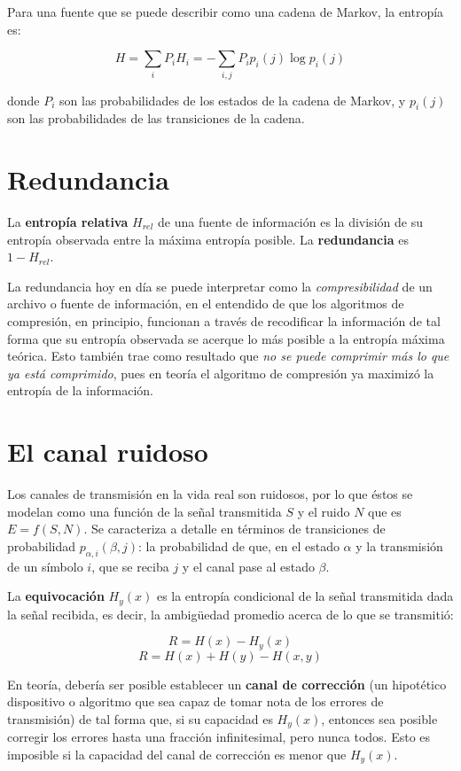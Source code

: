 \documentclass[spanish]{article}
\begin{document}
Para una fuente que se puede describir como una cadena de Markov, la entropía es:

\[
   H = \sum_i P_i H_i = -\sum_{i,j} P_i p_i(j) \log p_i(j)
\]

donde $P_i$ son las probabilidades de los estados de la cadena de Markov, y $p_i(j)$ son las probabilidades de las transiciones de la cadena.


\section {Redundancia}

La \textbf{entropía relativa} $H_{rel}$ de una fuente de información es la división de su entropía observada entre la máxima entropía posible. La \textbf{redundancia} es $1 - H_{rel}$.

La redundancia hoy en día se puede interpretar como la \textit{compresibilidad} de un archivo o fuente de información, en el entendido de que los algoritmos de compresión, en principio, funcionan a través de recodificar la información de tal forma que su entropía observada se acerque lo más posible a la entropía máxima teórica. Esto también trae como resultado que \textit{no se puede comprimir más lo que ya está comprimido}, pues en teoría el algoritmo de compresión ya maximizó la entropía de la información.


\section{El canal ruidoso}

Los canales de transmisión en la vida real son ruidosos, por lo que éstos se modelan como una función de la señal transmitida $S$ y el ruido $N$ que es $E = f(S, N)$. Se caracteriza a detalle en términos de transiciones de probabilidad $p_{\alpha,i}(\beta, j)$: la probabilidad de que, en el estado $\alpha$ y la transmisión de un símbolo $i$, que se reciba $j$ y el canal pase al estado $\beta$.

La \textbf{equivocación} $H_y(x)$ es la entropía condicional de la señal transmitida dada la señal recibida, es decir, la ambigüedad promedio acerca de lo que se transmitió:

\[
   R = H(x) - H_y(x)
\]
\[
   R = H(x) + H(y) - H(x,y)
\]

En teoría, debería ser posible establecer un \textbf{canal de corrección} (un hipotético dispositivo o algoritmo que sea capaz de tomar nota de los errores de transmisión) de tal forma que, si su capacidad es $H_y(x)$, entonces sea posible corregir los errores hasta una fracción infinitesimal, pero nunca todos. Esto es imposible si la capacidad del canal de corrección es menor que $H_y(x)$.
\end{document}
